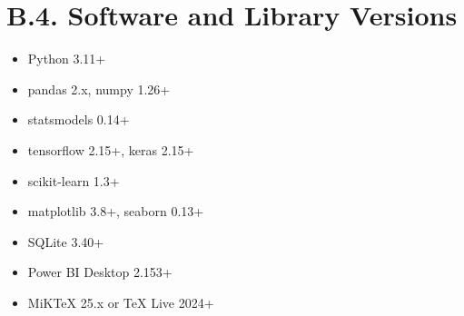 \section*{B.4. Software and Library Versions}

\begin{itemize}
    \item Python 3.11+
    \item pandas 2.x, numpy 1.26+
    \item statsmodels 0.14+
    \item tensorflow 2.15+, keras 2.15+
    \item scikit-learn 1.3+
    \item matplotlib 3.8+, seaborn 0.13+
    \item SQLite 3.40+
    \item Power BI Desktop 2.153+
    \item MiKTeX 25.x or TeX Live 2024+
\end{itemize}
